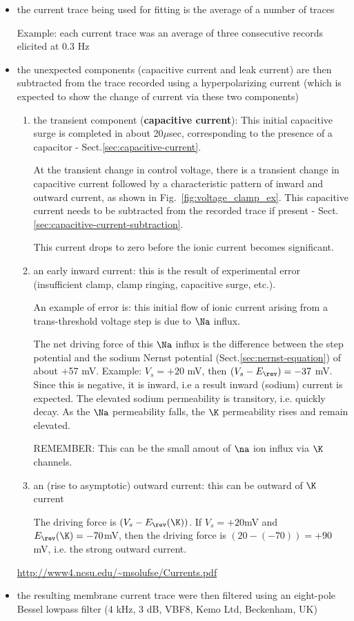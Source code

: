 \begin{itemize}
  \item the current trace being used for fitting is the average of a number of
  traces

Example: each current trace was an average of three consecutive
records elicited at 0.3 Hz
  
  \item the unexpected components (capacitive current and leak current) are then
  subtracted from the trace recorded using a hyperpolarizing current (which is
  expected to show the change of current via these two components)

\begin{enumerate}
  \item the transient component ({\bf capacitive current}): This initial
  capacitive surge is completed in about 20$\mu$sec, corresponding to the
  presence of a capacitor - Sect.\ref{sec:capacitive-current}.

At the transient change in control voltage, there is a transient
change in capacitive current followed by a characteristic pattern of
inward and outward current, as shown in Fig.~\ref{fig:voltage_clamp_ex}.
This capacitive current needs to be subtracted from the recorded trace if
present - Sect.\ref{sec:capacitive-current-subtraction}.

This current drops to zero before the ionic current becomes significant.

  \item an early inward current:
  this is the  result of experimental error (insufficient clamp, clamp ringing,
  capacitive surge, etc.).


An example of error is:  this initial flow of ionic current arising from a
trans-threshold voltage step is due to $\Na$ influx.

The net driving force of this $\Na$ influx is the difference between the step
potential and the sodium Nernst potential (Sect.\ref{sec:nernst-equation}) of
about +57 mV. Example: $V_s = +20$ mV, then $(V_s - E_\rev) = -37$ mV. Since
this is negative, it is inward, i.e a result inward (sodium) current is
expected. The elevated sodium permeability is transitory, i.e. quickly decay.
As the $\Na$ permeability falls, the $\K$ permeability rises and remain
elevated.

REMEMBER: This can be the small amout of $\na$ ion influx via
$\K$ channels.

  \item an (rise to asymptotic) outward current: this can be outward of $\K$
  current

The driving force is $(V_s - E_\rev(\K))$. If $V_s = +20$mV and
$E_\rev(\K)=-70$mV, then the driving force is $(20 - (-70))=+90$mV, i.e. the
strong outward current.

\end{enumerate}
\url{http://www4.ncsu.edu/~msolufse/Currents.pdf}
  

  
  \item the resulting membrane current trace were then filtered using an
  eight-pole Bessel lowpass filter (4 kHz, 3 dB, VBF8, Kemo Ltd, Beckenham, UK) 
\end{itemize}
